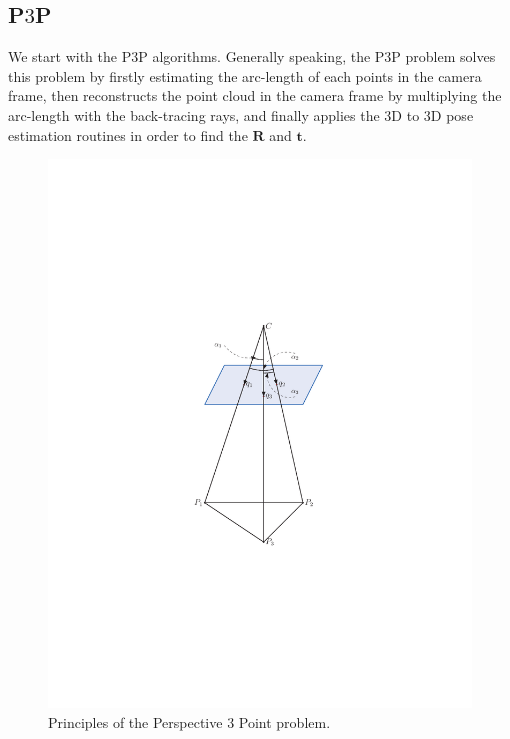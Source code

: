 \documentclass[a4paper]{article}
\begin{document}
\subsection{P$3$P}
We start with the P$3$P algorithms. Generally speaking, the P$3$P problem solves this problem by firstly estimating the arc-length of each points in the camera frame, then reconstructs the point cloud in the camera frame by multiplying the arc-length with the back-tracing rays, and finally applies the $3$D to $3$D pose estimation routines in order to find the $\mathbf{R}$ and $\mathbf{t}$.
\begin{figure}
\centering
\includegraphics[scale=0.8]{hand_eye_files/vision/figures/p3p.pdf}
\caption{Principles of the Perspective $3$ Point problem.}
\label{fig:p3p}
\end{figure}
\end{document}
